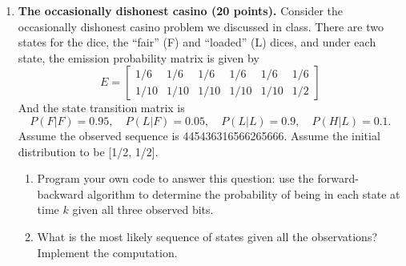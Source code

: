 \documentclass[11pt]{article}
\begin{document}
\begin{enumerate}
\item{\bf The occasionally dishonest casino (20 points). } Consider the occasionally dishonest casino problem we discussed in class. There are two states for the dice, the ``fair'' (F) and ``loaded'' (L) dices, and under each state, the emission probability matrix is given by 
\[
E = \begin{bmatrix}
1/6 & 1/6 & 1/6 & 1/6 & 1/6 & 1/6 \\
1/10 & 1/10 & 1/10 & 1/10 & 1/10 & 1/2
\end{bmatrix}
\]
And the state transition matrix is 
\[
P(F|F) = 0.95, \quad P(L|F) = 0.05, \quad P(L|L) = 0.9, \quad P(H|L) = 0.1. 
\]
Assume the observed sequence is 445436316566265666. Assume the initial distribution to be [1/2, 1/2].
\begin{enumerate}
\item Program your own  code to answer this question: use the forward-backward algorithm to determine the probability of being in each state at time $k$ given all three observed bits.
\item What is the most likely sequence of states given all the observations? Implement the computation. %


\end{enumerate}



\end{enumerate}
\end{document}
